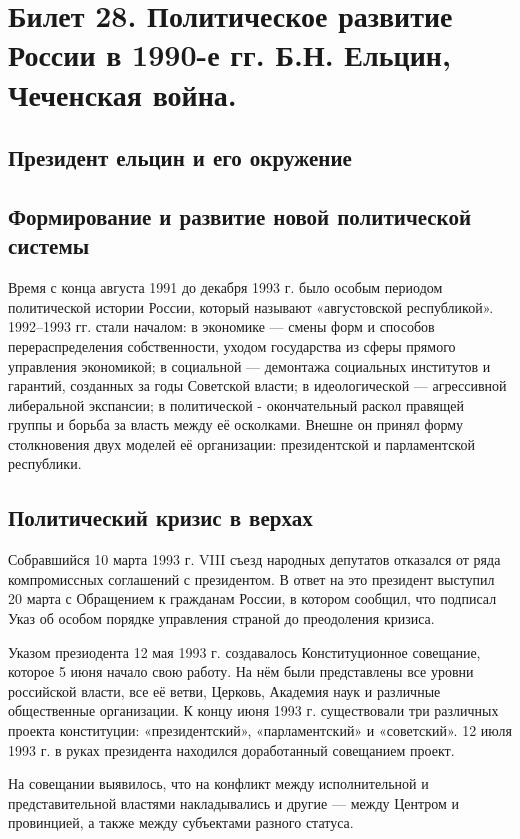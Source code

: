 \section{Билет 28. Политическое развитие России в 1990-е гг. Б.Н. Ельцин, Чеченская война.}
\subsection{Президент ельцин и его окружение}
\subsection{Формирование и развитие новой политической системы}
Время с конца августа 1991 до декабря 1993 г. было особым периодом политической истории России, который называют «августовской республикой». 1992–1993 гг. стали началом: в экономике — смены форм и способов перераспределения собственности, уходом государства из сферы прямого управления экономикой; в социальной — демонтажа социальных институтов и гарантий, созданных за годы Советской власти; в идеологической — агрессивной либеральной экспансии; в политической - окончательный раскол правящей группы и борьба за власть между её осколками. Внешне он принял форму столкновения двух моделей её организации: президентской и парламентской республики.

\subsection{Политический кризис в верхах}
Собравшийся 10 марта 1993 г. VIII съезд народных депутатов отказался от ряда компромиссных соглашений с президентом. В ответ на это президент выступил 20 марта с Обращением к гражданам России, в котором сообщил, что подписал Указ об особом порядке управления страной до преодоления кризиса.

Указом презиодента 12 мая 1993 г. создавалось Конституционное совещание, которое 5 июня начало свою работу. На нём были представлены все уровни российской власти, все её ветви, Церковь, Академия наук и различные общественные организации. К концу июня 1993 г. существовали три различных проекта конституции: «президентский», «парламентский» и «советский». 12 июля 1993 г. в руках президента находился доработанный совещанием проект.

На совещании выявилось, что на конфликт между исполнительной и представительной властями накладывались и другие — между Центром и провинцией, а также между субъектами разного статуса.

